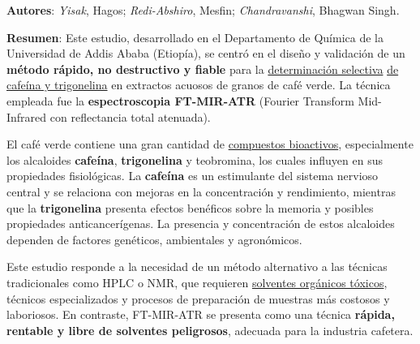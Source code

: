 \documentclass{article}
\begin{document}
\textbf{Autores}: \textit{Yisak}, Hagos; \textit{Redi-Abshiro}, Mesfin; \textit{Chandravanshi}, Bhagwan Singh. \vspace{0.5cm}

\textbf{Resumen}: Este estudio, desarrollado en el Departamento de Química de la Universidad de Addis Ababa (Etiopía), se centró en el diseño y validación de un \textbf{método rápido, no destructivo y fiable} para la \underline{determinación selectiva}  \underline{de cafeína y trigonelina} en extractos acuosos de granos de café verde. La técnica empleada fue la \textbf{espectroscopia FT-MIR-ATR} (Fourier Transform Mid-Infrared con reflectancia total atenuada).  

El café verde contiene una gran cantidad de \underline{compuestos bioactivos}, especialmente los alcaloides \textbf{cafeína}, \textbf{trigonelina} y teobromina, los cuales influyen en sus propiedades fisiológicas. La \textbf{cafeína} es un estimulante del sistema nervioso central y se relaciona con mejoras en la concentración y rendimiento, mientras que la \textbf{trigonelina} presenta efectos benéficos sobre la memoria y posibles propiedades anticancerígenas. La presencia y concentración de estos alcaloides dependen de factores genéticos, ambientales y agronómicos.  

Este estudio responde a la necesidad de un método alternativo a las técnicas tradicionales como HPLC o NMR, que requieren \underline{solventes orgánicos tóxicos}, técnicos especializados y procesos de preparación de muestras más costosos y laboriosos. En contraste, FT-MIR-ATR se presenta como una técnica \textbf{rápida, rentable y libre de solventes peligrosos}, adecuada para la industria cafetera. \vspace{0.5cm}
\end{document}
